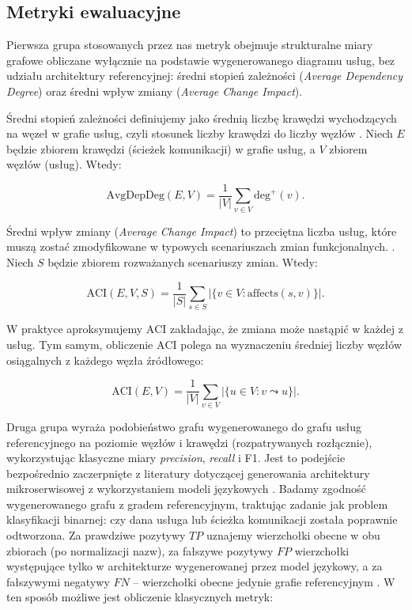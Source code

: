 \subsection{Metryki ewaluacyjne}

Pierwsza grupa stosowanych przez nas metryk obejmuje strukturalne miary grafowe obliczane wyłącznie na podstawie wygenerowanego diagramu usług, bez udziału architektury referencyjnej: średni stopień zależności (\emph{Average Dependency Degree}) oraz średni wpływ zmiany (\emph{Average Change Impact}).

Średni stopień zależności definiujemy jako średnią liczbę krawędzi wychodzących na węzeł w grafie usług, czyli stosunek liczby krawędzi do liczby węzłów \cite{ford2021}. Niech $E$ będzie zbiorem krawędzi (ścieżek komunikacji) w grafie usług, a $V$ zbiorem węzłów (usług). Wtedy:

\begin{equation}
\text{AvgDepDeg}(E, V) = \frac{1}{|V|} \sum_{v \in V} \text{deg}^+(v).
\end{equation}

Średni wpływ zmiany (\emph{Average Change Impact}) to przeciętna liczba usług, które muszą zostać zmodyfikowane w typowych scenariuszach zmian funkcjonalnych. \cite{ahuja_automatically_2025}. Niech $S$ będzie zbiorem rozważanych scenariuszy zmian. Wtedy:

\begin{equation}
\text{ACI}(E, V, S) = \frac{1}{|S|} \sum_{s \in S} |\{v \in V : \text{affects}(s, v)\}|.
\end{equation}

\noindent
W praktyce aproksymujemy $\text{ACI}$ zakładając, że zmiana może nastąpić w każdej z usług. Tym samym, obliczenie $\text{ACI}$ polega na wyznaczeniu średniej liczby węzłów osiągalnych z każdego węzła źródłowego:

\begin{equation}
\text{ACI}(E, V) = \frac{1}{|V|} \sum_{v \in V} |\{u \in V : v \leadsto u\}|.
\end{equation}

Druga grupa wyraża podobieństwo grafu wygenerowanego do grafu usług referencyjnego na poziomie węzłów i krawędzi (rozpatrywanych rozłącznie), wykorzystując klasyczne miary \emph{precision}, \emph{recall} i F1. Jest to podejście bezpośrednio zaczerpnięte z literatury dotyczącej generowania architektury mikroserwisowej z wykorzystaniem modeli językowych \cite{pereiraGeneratingMicroserviceArchitectures2025}. Badamy zgodność wygenerowanego grafu z gradem referencyjnym, traktując zadanie jak problem klasyfikacji binarnej: czy dana usługa lub ścieżka komunikacji została poprawnie odtworzona. Za prawdziwe pozytywy $TP$ uznajemy wierzchołki obecne w obu zbiorach (po normalizacji nazw), za fałszywe pozytywy $FP$ wierzchołki występujące tylko w architekturze wygenerowanej przez model językowy, a za fałszywymi negatywy $FN$ -- wierzchołki obecne jedynie grafie referencyjnym \cite{pereiraGeneratingMicroserviceArchitectures2025}. W ten sposób możliwe jest obliczenie klasycznych metryk:

